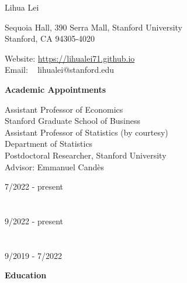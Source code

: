 \documentclass{article}
\begin{document}
\begin{Huge}
\noindent Lihua Lei
\end{Huge}

\vspace{5mm}
\begin{minipage}{0.6\linewidth}
  \flushleft
\noindent Sequoia Hall, 390 Serra Mall, Stanford University \\
\noindent Stanford, CA 94305-4020
\end{minipage}
\hfill
\begin{minipage}{0.4\linewidth}
  Website: \url{https://lihualei71.github.io}\\
  Email: \,\,\,\,\,lihualei@stanford.edu
\end{minipage}

\vspace{5mm}
\begin{large}
\noindent \textbf{Academic Appointments}
\end{large}
\vspace{5mm}

\begin{minipage}{0.65\linewidth}
  \noindent Assistant Professor of Economics \\
  Stanford Graduate School of Business\\

  \noindent Assistant Professor of Statistics (by courtesy) \\
  Department of Statistics\\
  
\noindent Postdoctoral Researcher, Stanford University\\
Advisor: Emmanuel Cand\`{e}s
\end{minipage}\hfill
\begin{minipage}{0.34\linewidth}
\flushright
\vspace{-3mm}
7/2022 - present\\
~\\
~\\
9/2022 - present\\
~\\
~\\
9/2019 - 7/2022 \\
\end{minipage}

\vspace{5mm}
\begin{large}
\noindent \textbf{Education}
\end{large}
\vspace{5mm}
\end{document}
